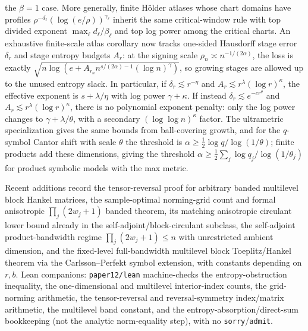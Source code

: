 \documentclass[11pt]{article}
\begin{document}
the \(\beta=1\) case.  More generally, finite H\"older atlases whose chart
domains have profiles \(\rho^{-d_\ell}(\log(e/\rho))^{\gamma_\ell}\) inherit
the same critical-window rule with top divided exponent
\(\max_\ell d_\ell/\beta_\ell\) and top log power among the critical charts.
An exhaustive finite-scale atlas corollary now tracks one-sided Hausdorff stage
error \(\delta_r\) and stage entropy budgets \(A_r\): at the signing scale
\(\rho_n\asymp n^{-1/(2\alpha)}\), the loss is exactly
\(\sqrt{n\log(e+A_{r_n}n^{s/(2\alpha)-1}(\log n)^\gamma)}\), so growing stages
are allowed up to the unused entropy slack.  In particular, if
\(\delta_r\lesssim r^{-\eta}\) and \(A_r\lesssim
r^\lambda(\log r)^\kappa\), the effective exponent is
\(s+\lambda/\eta\) with log power \(\gamma+\kappa\).  If instead
\(\delta_r\lesssim e^{-cr^\theta}\) and \(A_r\lesssim
r^\lambda(\log r)^\kappa\), there is no polynomial exponent penalty: only the
log power changes to \(\gamma+\lambda/\theta\), with a secondary
\((\log\log n)^\kappa\) factor.
The ultrametric specialization gives the same bounds from ball-covering growth,
and for the \(q\)-symbol Cantor shift with scale \(\theta\) the threshold is
\(\alpha\ge\frac12\log q/\log(1/\theta)\); finite products add these
dimensions, giving the threshold
\(\alpha\ge\frac12\sum_j\log q_j/\log(1/\theta_j)\) for product symbolic
models with the max metric.

Recent additions record the tensor-reversal proof for arbitrary banded
multilevel block Hankel matrices, the sample-optimal norming-grid count and
formal anisotropic $\prod_j(2w_j+1)$ banded theorem, its matching anisotropic
circulant lower bound already in the self-adjoint/block-circulant subclass, the
self-adjoint product-bandwidth regime
$\prod_j(2w_j+1)\le n$ with unrestricted ambient dimension, and the fixed-level
full-bandwidth multilevel block Toeplitz/Hankel theorem via the
Carlsson--Perfekt symbol extension, with constants depending on \(r,b\).  Lean
companions:
\texttt{paper12/lean} machine-checks the entropy-obstruction inequality, the
one-dimensional and multilevel interior-index counts, the grid-norming
arithmetic, the tensor-reversal and reversal-symmetry index/matrix arithmetic,
the multilevel band constant, and the entropy-absorption/direct-sum bookkeeping
(not the analytic norm-equality step), with no \texttt{sorry}/\texttt{admit}.
\end{document}

